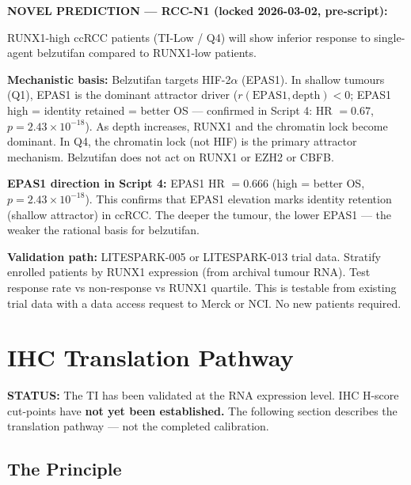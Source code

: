 \documentclass[11pt, a4paper]{article}
\begin{document}
\begin{mdframed}[backgroundcolor=criticalbox,
                 linecolor=red!60!black,
                 linewidth=1pt]
\textbf{NOVEL PREDICTION --- RCC-N1
(locked 2026-03-02, pre-script):}

RUNX1-high ccRCC patients (TI-Low / Q4) will
show inferior response to single-agent
belzutifan compared to RUNX1-low patients.

\medskip
\textbf{Mechanistic basis:}
Belzutifan targets HIF-2$\alpha$ (EPAS1).
In shallow tumours (Q1), EPAS1 is the
dominant attractor driver ($r(\text{EPAS1},
\text{depth}) < 0$; EPAS1 high = identity
retained = better OS --- confirmed in
Script 4: HR $= 0.67$, $p = 2.43
\times 10^{-18}$). As depth increases,
RUNX1 and the chromatin lock become
dominant. In Q4, the chromatin lock
(not HIF) is the primary attractor
mechanism. Belzutifan does not act on
RUNX1 or EZH2 or CBFB.

\medskip
\textbf{EPAS1 direction in Script 4:}
EPAS1 HR $= 0.666$ (high = better OS,
$p = 2.43 \times 10^{-18}$). This confirms
that EPAS1 elevation marks identity
retention (shallow attractor) in ccRCC.
The deeper the tumour, the lower EPAS1
--- the weaker the rational basis
for belzutifan.

\medskip
\textbf{Validation path:}
LITESPARK-005 or LITESPARK-013 trial data.
Stratify enrolled patients by RUNX1
expression (from archival tumour RNA).
Test response rate vs non-response vs
RUNX1 quartile.
This is testable from existing trial data
with a data access request to Merck or NCI.
No new patients required.
\end{mdframed}

\section{IHC Translation Pathway}
\label{sec:ihc}

\begin{mdframed}[backgroundcolor=warningbox,
                 linecolor=orange!70!black,
                 linewidth=1pt]
\textbf{STATUS:} The TI has been validated
at the RNA expression level. IHC H-score
cut-points have \textbf{not yet been
established.} The following section
describes the translation pathway --- not
the completed calibration.
\end{mdframed}

\subsection{The Principle}
\end{document}
